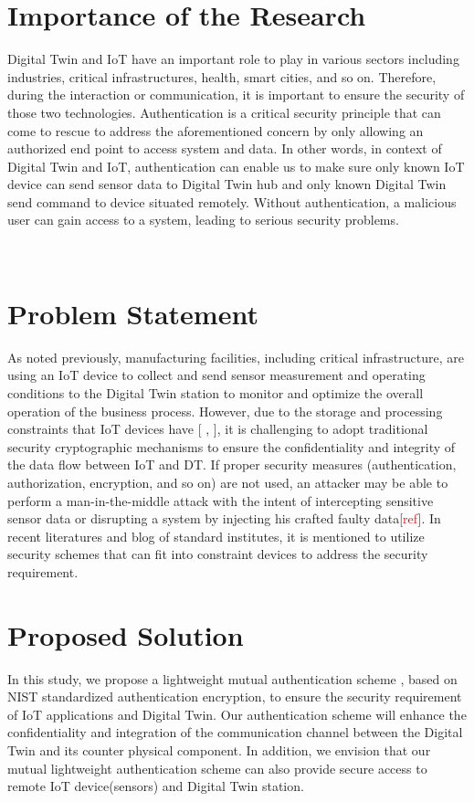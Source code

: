\section{Importance of the Research}
Digital Twin and IoT have an important role to play in various sectors including industries, critical infrastructures, health, smart cities, and so on. Therefore, during the interaction or communication, it is important to ensure the security of those two technologies. Authentication is a critical security principle that can come to rescue to address the aforementioned concern by only allowing an authorized end point to access system and data. In other words, in context of Digital Twin and IoT, authentication can enable us to make sure only known IoT device can send sensor data to Digital Twin hub and only known Digital Twin send command to device situated remotely. Without authentication, a malicious user can gain access to a system, leading to serious security problems. 

\
\section{Problem Statement}
As noted previously, manufacturing facilities, including critical infrastructure, are using an IoT device to collect and send sensor measurement and operating conditions to the Digital Twin station to monitor and optimize the overall operation of the business process. However, due to the storage and processing constraints that IoT devices have [ \cite{williams_survey_2022}, \cite{noauthor_lightweight_nodate}], it is challenging to adopt traditional security cryptographic mechanisms to ensure the confidentiality and integrity of the data flow between IoT and DT. If proper security measures (authentication, authorization, encryption, and so on) are not used, an attacker may be able to perform a man-in-the-middle attack with the intent of intercepting sensitive sensor data or disrupting a system by injecting his crafted faulty data[\textcolor{red}{ref}]. In recent literatures and blog of standard institutes, it is mentioned to utilize security schemes that can fit into constraint devices to address the security requirement.  

\section{Proposed Solution}
In this study, we propose a lightweight mutual authentication scheme , based on NIST standardized authentication encryption, to ensure the security requirement of IoT applications and Digital Twin. Our authentication scheme will enhance the confidentiality and integration of the communication channel between the Digital Twin and its counter physical component. In addition, we envision that our mutual lightweight authentication scheme can also provide secure access to remote IoT device(sensors) and  Digital Twin station. 

